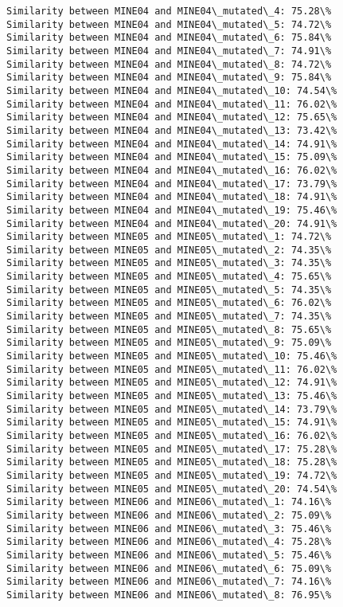 \documentclass[11pt]{article}
\begin{document}
\begin{Verbatim}[commandchars=\\\{\}]
Similarity between MINE04 and MINE04\_mutated\_4: 75.28\%
Similarity between MINE04 and MINE04\_mutated\_5: 74.72\%
Similarity between MINE04 and MINE04\_mutated\_6: 75.84\%
Similarity between MINE04 and MINE04\_mutated\_7: 74.91\%
Similarity between MINE04 and MINE04\_mutated\_8: 74.72\%
Similarity between MINE04 and MINE04\_mutated\_9: 75.84\%
Similarity between MINE04 and MINE04\_mutated\_10: 74.54\%
Similarity between MINE04 and MINE04\_mutated\_11: 76.02\%
Similarity between MINE04 and MINE04\_mutated\_12: 75.65\%
Similarity between MINE04 and MINE04\_mutated\_13: 73.42\%
Similarity between MINE04 and MINE04\_mutated\_14: 74.91\%
Similarity between MINE04 and MINE04\_mutated\_15: 75.09\%
Similarity between MINE04 and MINE04\_mutated\_16: 76.02\%
Similarity between MINE04 and MINE04\_mutated\_17: 73.79\%
Similarity between MINE04 and MINE04\_mutated\_18: 74.91\%
Similarity between MINE04 and MINE04\_mutated\_19: 75.46\%
Similarity between MINE04 and MINE04\_mutated\_20: 74.91\%
Similarity between MINE05 and MINE05\_mutated\_1: 74.72\%
Similarity between MINE05 and MINE05\_mutated\_2: 74.35\%
Similarity between MINE05 and MINE05\_mutated\_3: 74.35\%
Similarity between MINE05 and MINE05\_mutated\_4: 75.65\%
Similarity between MINE05 and MINE05\_mutated\_5: 74.35\%
Similarity between MINE05 and MINE05\_mutated\_6: 76.02\%
Similarity between MINE05 and MINE05\_mutated\_7: 74.35\%
Similarity between MINE05 and MINE05\_mutated\_8: 75.65\%
Similarity between MINE05 and MINE05\_mutated\_9: 75.09\%
Similarity between MINE05 and MINE05\_mutated\_10: 75.46\%
Similarity between MINE05 and MINE05\_mutated\_11: 76.02\%
Similarity between MINE05 and MINE05\_mutated\_12: 74.91\%
Similarity between MINE05 and MINE05\_mutated\_13: 75.46\%
Similarity between MINE05 and MINE05\_mutated\_14: 73.79\%
Similarity between MINE05 and MINE05\_mutated\_15: 74.91\%
Similarity between MINE05 and MINE05\_mutated\_16: 76.02\%
Similarity between MINE05 and MINE05\_mutated\_17: 75.28\%
Similarity between MINE05 and MINE05\_mutated\_18: 75.28\%
Similarity between MINE05 and MINE05\_mutated\_19: 74.72\%
Similarity between MINE05 and MINE05\_mutated\_20: 74.54\%
Similarity between MINE06 and MINE06\_mutated\_1: 74.16\%
Similarity between MINE06 and MINE06\_mutated\_2: 75.09\%
Similarity between MINE06 and MINE06\_mutated\_3: 75.46\%
Similarity between MINE06 and MINE06\_mutated\_4: 75.28\%
Similarity between MINE06 and MINE06\_mutated\_5: 75.46\%
Similarity between MINE06 and MINE06\_mutated\_6: 75.09\%
Similarity between MINE06 and MINE06\_mutated\_7: 74.16\%
Similarity between MINE06 and MINE06\_mutated\_8: 76.95\%

\end{Verbatim}
\end{document}
